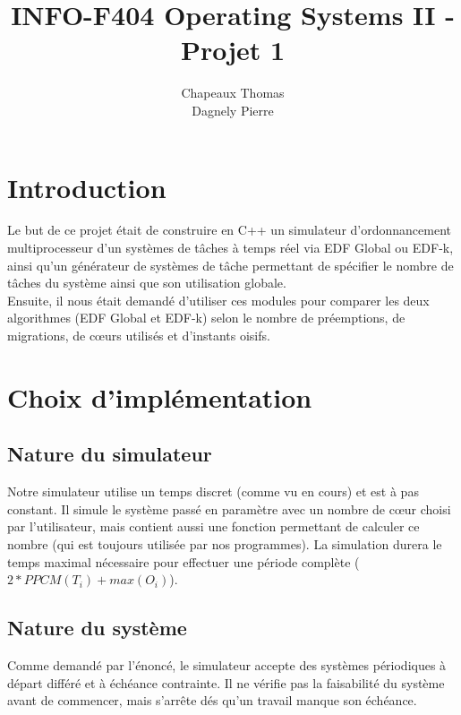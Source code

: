 \documentclass[a4paper,10pt]{article}
\title{INFO-F404 Operating Systems II - Projet 1}
\author{Chapeaux Thomas\\Dagnely Pierre}
\begin{document}
\maketitle

\section{Introduction}

	Le but de ce projet était de construire en C++ un simulateur d'ordonnancement multiprocesseur d'un systèmes de tâches à temps réel via EDF Global ou 		EDF-k, ainsi qu'un générateur de systèmes de tâche permettant de spécifier le nombre de tâches du système ainsi que son utilisation globale.\\		

	Ensuite, il nous était demandé d'utiliser ces modules pour comparer les deux algorithmes (EDF Global et EDF-k) selon le nombre de préemptions, de 			migrations, de cœurs utilisés et d'instants oisifs.

\section{Choix d'implémentation}

	\subsection{Nature du simulateur}
		Notre simulateur utilise un temps discret (comme vu en cours) et est à pas constant. Il simule le système passé en paramètre avec un nombre de cœur choisi par l'utilisateur, mais contient aussi une fonction permettant de calculer ce nombre (qui est toujours utilisée par nos programmes). La simulation durera le temps maximal nécessaire pour 			effectuer une période complète ($2*PPCM(T_i) + max(O_i)$).

	\subsection{Nature du système}
		Comme demandé par l'énoncé, le simulateur accepte des systèmes périodiques à départ différé et à échéance contrainte. Il ne vérifie pas la 					faisabilité du système avant de commencer, mais s'arrête dés qu'un travail manque son échéance.\\
\end{document}
